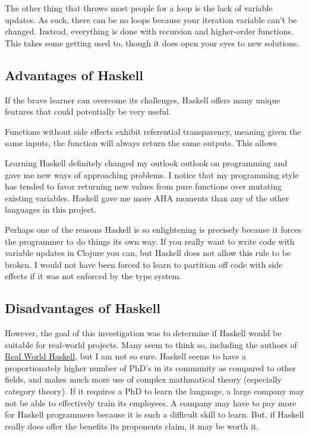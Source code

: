 \documentclass{article}
\begin{document}
The other thing that throws most people for a loop is the lack of variable
updates.  As such, there can be no loops because your iteration variable can't
be changed.  Instead, everything is done with recursion and higher-order
functions.  This takes some getting used to, though it does open your eyes to
new solutions.

\subsection{Advantages of Haskell}

If the brave learner can overcome its challenges, Haskell offers many unique
features that could potentially be very useful.  

Functions without side effects exhibit referential transparency, meaning given
the same inputs, the function will always return the same outputs.  This allows 

Learning Haskell definitely changed my outlook outlook on programming and gave
me new ways of approaching problems.  I notice that my programming style has
tended to favor returning new values from pure functions over mutating existing
variables.  Haskell gave me more AHA moments than any of the other languages in
this project.

Perhaps one of the reasons Haskell is so enlightening is precisely because it
forces the programmer to do things its own way.  If you really want to write
code with variable updates in Clojure you can, but Haskell does not allow this
rule to be broken.  I would not have been forced to learn to partition off code
with side effects if it was not enforced by the type system.

\subsection{Disadvantages of Haskell}

However, the goal of this investigation was to determine if Haskell would be
suitable for real-world projects.  Many seem to think so, including the authors
of \underline{Real World Haskell}, but I am not so sure.  Haskell seems to have
a proportionately higher number of PhD's in its community as compared to other
fields, and makes much more use of complex mathmatical theory (especially
category theory).  If it requires a PhD to learn the language, a large company
may not be able to effectively train its employees.  A company may have to pay
more for Haskell programmers because it is such a difficult skill to learn.
But, if Haskell really does offer the benefits its proponents claim, it may be
worth it.
\end{document}
